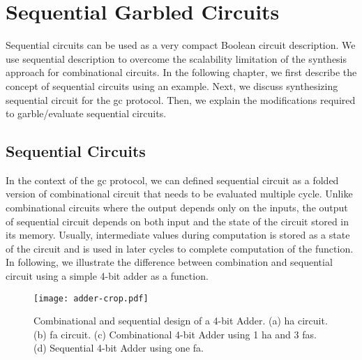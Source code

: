 \chapter{Sequential Garbled Circuits}\label{chap:seq}
Sequential circuits can be used as a very compact Boolean circuit description. We use sequential description to overcome the scalability limitation of the synthesis approach for combinational circuits.
In the following chapter, we first describe the concept of sequential circuits using an example.
Next, we discuss synthesizing sequential circuit for the \acrshort{gc} protocol.
Then, we explain the modifications required to garble/evaluate sequential circuits.

\section{Sequential Circuits}\label{sec:seq-seq}
In the context of the \acrshort{gc} protocol, we can defined sequential circuit as a folded version of combinational circuit that needs to be evaluated multiple cycle.
Unlike combinational circuits where the output depends only on the inputs, the output of sequential circuit depends on both input and the state of the circuit stored in its memory.
Usually, intermediate values during computation is stored as a state of the circuit and is used in later cycles to complete computation of the function.
In following, we illustrate the difference between combination and sequential circuit using a simple 4-bit adder as a function.

\begin{figure}[h]
    \centering
    \texttt{[image: adder-crop.pdf]}
    \caption{Combinational and sequential design of a 4-bit Adder.
  (a) \acrshort{ha} circuit.
  (b) \acrshort{fa} circuit.
  (c) Combinational 4-bit Adder using 1 \acrshort{ha} and 3 \acrshort{fa}s.
  (d) Sequential 4-bit Adder using one \acrshort{fa}.}\label{fig:combSeq}
\end{figure}

